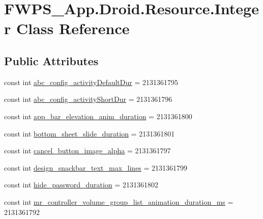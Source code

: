 \hypertarget{class_f_w_p_s___app_1_1_droid_1_1_resource_1_1_integer}{}\section{F\+W\+P\+S\+\_\+\+App.\+Droid.\+Resource.\+Integer Class Reference}
\label{class_f_w_p_s___app_1_1_droid_1_1_resource_1_1_integer}
\subsection*{Public Attributes}
\begin{DoxyCompactItemize}
\item 
const int \mbox{\hyperlink{class_f_w_p_s___app_1_1_droid_1_1_resource_1_1_integer_a87285dbb61e11292ba3be0621e8e5351}{abc\+\_\+config\+\_\+activity\+Default\+Dur}} = 2131361795
\item 
const int \mbox{\hyperlink{class_f_w_p_s___app_1_1_droid_1_1_resource_1_1_integer_a52656e9f5434b46e02e1a7cd961cc4ee}{abc\+\_\+config\+\_\+activity\+Short\+Dur}} = 2131361796
\item 
const int \mbox{\hyperlink{class_f_w_p_s___app_1_1_droid_1_1_resource_1_1_integer_a8271a0ef96074fe015d84d2fa22065bc}{app\+\_\+bar\+\_\+elevation\+\_\+anim\+\_\+duration}} = 2131361800
\item 
const int \mbox{\hyperlink{class_f_w_p_s___app_1_1_droid_1_1_resource_1_1_integer_a6a4ba9df28051060338598337df153d4}{bottom\+\_\+sheet\+\_\+slide\+\_\+duration}} = 2131361801
\item 
const int \mbox{\hyperlink{class_f_w_p_s___app_1_1_droid_1_1_resource_1_1_integer_a7b013703af3f63e630e695d8a803abc9}{cancel\+\_\+button\+\_\+image\+\_\+alpha}} = 2131361797
\item 
const int \mbox{\hyperlink{class_f_w_p_s___app_1_1_droid_1_1_resource_1_1_integer_ae503dff036b16e28024094410a92e799}{design\+\_\+snackbar\+\_\+text\+\_\+max\+\_\+lines}} = 2131361799
\item 
const int \mbox{\hyperlink{class_f_w_p_s___app_1_1_droid_1_1_resource_1_1_integer_af0fd2ff8ca66c26150ec0c5505967723}{hide\+\_\+password\+\_\+duration}} = 2131361802
\item 
const int \mbox{\hyperlink{class_f_w_p_s___app_1_1_droid_1_1_resource_1_1_integer_aa0228e4f4d541aba32168ad328645995}{mr\+\_\+controller\+\_\+volume\+\_\+group\+\_\+list\+\_\+animation\+\_\+duration\+\_\+ms}} = 2131361792
\item 

\end{DoxyCompactItemize}
